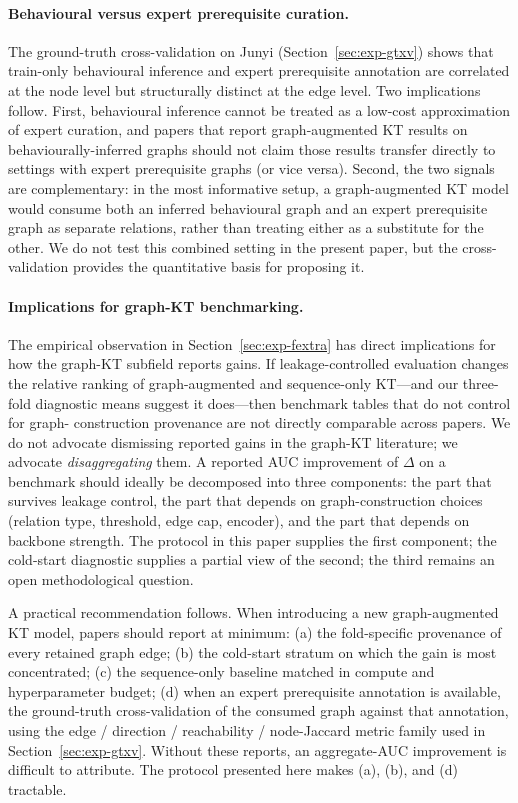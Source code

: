 \paragraph{Behavioural versus expert prerequisite curation.}
The ground-truth cross-validation on Junyi
(Section~\ref{sec:exp-gtxv}) shows that train-only behavioural
inference and expert prerequisite annotation are correlated at the
node level but structurally distinct at the edge level. Two
implications follow. First, behavioural inference cannot be treated
as a low-cost approximation of expert curation, and papers that
report graph-augmented KT results on behaviourally-inferred graphs
should not claim those results transfer directly to settings with
expert prerequisite graphs (or vice versa). Second, the two signals
are complementary: in the most informative setup, a graph-augmented
KT model would consume both an inferred behavioural graph and an
expert prerequisite graph as separate relations, rather than treating
either as a substitute for the other. We do not test this combined
setting in the present paper, but the cross-validation provides the
quantitative basis for proposing it.
\paragraph{Implications for graph-KT benchmarking.}
The empirical observation in Section~\ref{sec:exp-fextra} has direct
implications for how the graph-KT subfield reports gains. If
leakage-controlled evaluation changes the relative ranking of
graph-augmented and sequence-only KT---and our three-fold diagnostic
means suggest it does---then benchmark tables that do not control for graph-
construction provenance are not directly comparable across papers. We
do not advocate dismissing reported gains in the graph-KT literature;
we advocate \emph{disaggregating} them. A reported AUC improvement of
$\Delta$ on a benchmark should ideally be decomposed into three
components: the part that survives leakage control, the part that
depends on graph-construction choices (relation type, threshold, edge
cap, encoder), and the part that depends on backbone strength. The
protocol in this paper supplies the first component; the cold-start
diagnostic supplies a partial view of the second; the third remains an
open methodological question.

A practical recommendation follows. When introducing a new
graph-augmented KT model, papers should report at minimum: (a) the
fold-specific provenance of every retained graph edge; (b) the
cold-start stratum on which the gain is most concentrated; (c) the
sequence-only baseline matched in compute and hyperparameter budget;
(d) when an expert prerequisite annotation is available, the
ground-truth cross-validation of the consumed graph against that
annotation, using the edge / direction / reachability / node-Jaccard
metric family used in Section~\ref{sec:exp-gtxv}. Without these
reports, an aggregate-AUC improvement is difficult to attribute. The
protocol presented here makes (a), (b), and (d) tractable.
